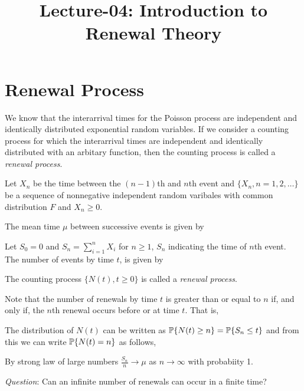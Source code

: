 \documentclass[a4paper,10pt, english]{article}
\title{Lecture-04: Introduction to Renewal Theory}
\author{}
\begin{document}
\maketitle
\section{Renewal Process}

We know that the interarrival times for the Poisson process are independent and identically distributed exponential random variables.
If we consider a counting process for which the interarrival times are independent and identically distributed with an arbitary function, then the counting process is called a \textit{renewal process}.

Let $X_n$ be the time between the $(n-1)$th and $n$th event and $\{X_n,n=1,2,\dots\}$ be a sequence of nonnegative independent random varibales with common distribution $F$ and $X_n \ge 0$.

The mean time $\mu$ between successive events is given by


Let $S_0=0$ and $S_n = \sum_{i=1}^{n} X_i$ for $n \ge 1$, $S_n$ indicating the time of $n$th event.
The number of events by time $t$, is given by

\begin{defn}
The counting process $\{ N(t),t \ge 0\}$ is called a \textit{renewal process}.
\end{defn}

Note that the number of renewals by time $t$ is greater than or equal to $n$ if, and only if, the $n$th renewal occurs before or at time $t$.
That is,

The distribution of $N(t)$ can be written as $\P\{N(t) \ge n\} = \P\{S_n \le t\}$ and from this we can write $\P\{N(t)=n\}$ as follows,


\begin{prop}
By strong law of large numbers $\frac{S_n}{n} \to \mu$ as $n \to \infty$ with probabiity 1.
\end{prop}


\textit{Question}: Can an infinite number of renewals can occur in a finite time?
\end{document}
